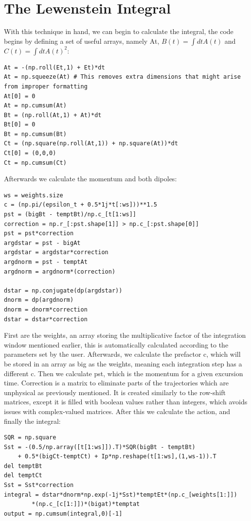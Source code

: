 \documentclass[11pt,a4paper]{report}
\begin{document}
\newpage
{}
\section{The Lewenstein Integral}
With this technique in hand, we can begin to calculate the integral, the code begins by defining a set of useful arrays, namely At, $B(t) = \int dt A(t)$ and $C(t) = \int dt A(t)^2$:
\begin{verbatim}
At = -(np.roll(Et,1) + Et)*dt 
At = np.squeeze(At) # This removes extra dimensions that might arise from improper formatting 
At[0] = 0
At = np.cumsum(At)
Bt = (np.roll(At,1) + At)*dt
Bt[0] = 0
Bt = np.cumsum(Bt)
Ct = (np.square(np.roll(At,1)) + np.square(At))*dt
Ct[0] = (0,0,0)
Ct = np.cumsum(Ct)
\end{verbatim}
Afterwards we calculate the momentum and both dipoles:
\begin{verbatim}
ws = weights.size
c = (np.pi/(epsilon_t + 0.5*1j*t[:ws]))**1.5
pst = (bigBt - temptBt)/np.c_[t[1:ws]]
correction = np.r_[:pst.shape[1]] > np.c_[:pst.shape[0]]    
pst = pst*correction
argdstar = pst - bigAt
argdstar = argdstar*correction
argdnorm = pst - temptAt
argdnorm = argdnorm*(correction)

dstar = np.conjugate(dp(argdstar))
dnorm = dp(argdnorm)
dnorm = dnorm*correction
dstar = dstar*correction
\end{verbatim}

First are the weights, an array storing the multiplicative factor of the integration window mentioned earlier, this is automatically calculated according to the parameters set by the user. Afterwards, we calculate the prefactor c, which will be stored in an array as big as the weights, meaning each integration step has a different c. Then we calculate pst, which is the momentum for a given excursion time. Correction is a matrix to eliminate parts of the trajectories which are unphysical as previously mentioned. It is created similarly to the row-shift matrices, except it is filled with boolean values rather than integers, which avoids issues with complex-valued matrices. After this we calculate the action, and finally the integral:

\begin{verbatim}
SQR = np.square
Sst = -(0.5/np.array([t[1:ws]]).T)*SQR(bigBt - temptBt) 
	+ 0.5*(bigCt-temptCt) + Ip*np.reshape(t[1:ws],(1,ws-1)).T
del temptBt
del temptCt
Sst = Sst*correction
integral = dstar*dnorm*np.exp(-1j*Sst)*temptEt*(np.c_[weights[1:]])
		*(np.c_[c[1:]])*(bigat)*temptat
output = np.cumsum(integral,0)[-1]
\end{verbatim}
\thispagestyle{fancy}
\renewcommand{\headrulewidth}{0pt}
\fancyhead{}
\setlength{\footskip}{0pt}
\end{document}
